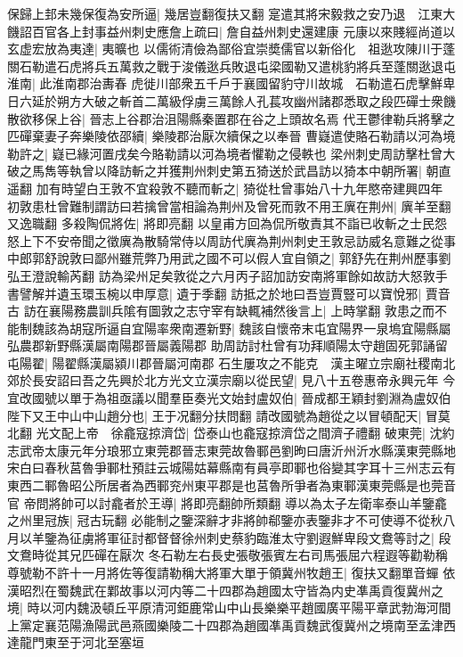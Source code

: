 保歸上邽未幾保復為安所逼|{
	幾居豈翻復扶又翻}
寔遣其將宋毅救之安乃退　江東大饑詔百官各上封事益州刺史應詹上疏曰|{
	詹自益州刺史還建康}
元康以來賤經尚道以玄虚宏放為夷達|{
	夷曠也}
以儒術清儉為鄙俗宜崇奬儒官以新俗化　祖逖攻陳川于蓬關石勒遣石虎將兵五萬救之戰于浚儀逖兵敗退屯梁國勒又遣桃豹將兵至蓬關逖退屯淮南|{
	此淮南郡治夀春}
虎徙川部衆五千戶于襄國留豹守川故城　石勒遣石虎擊鮮卑日六延於朔方大破之斬首二萬級俘虜三萬餘人孔萇攻幽州諸郡悉取之段匹磾士衆饑散欲移保上谷|{
	晉志上谷郡治沮陽縣秦置郡在谷之上頭故名焉}
代王鬱律勒兵將擊之匹磾棄妻子奔樂陵依邵續|{
	樂陵郡治厭次續保之以奉晉}
曹嶷遣使賂石勒請以河為境勒許之|{
	嶷已緣河置戌矣今賂勒請以河為境者懼勒之侵軼也}
梁州刺史周訪擊杜曾大破之馬雋等執曾以降訪斬之并獲荆州刺史第五猗送於武昌訪以猗本中朝所署|{
	朝直遥翻}
加有時望白王敦不宜殺敦不聽而斬之|{
	猗從杜曾事始八十九年愍帝建興四年}
初敦患杜曾難制謂訪曰若擒曾當相論為荆州及曾死而敦不用王廙在荆州|{
	廙羊至翻又逸職翻}
多殺陶侃將佐|{
	將即亮翻}
以皇甫方回為侃所敬責其不詣已收斬之士民怨怒上下不安帝聞之徵廙為散騎常侍以周訪代廙為荆州刺史王敦忌訪威名意難之從事中郎郭舒說敦曰鄙州雖荒弊乃用武之國不可以假人宜自領之|{
	郭舒先在荆州歷事劉弘王澄說輸芮翻}
訪為梁州足矣敦從之六月丙子詔加訪安南將軍餘如故訪大怒敦手書譬解并遺玉環玉椀以申厚意|{
	遺于季翻}
訪抵之於地曰吾豈賈豎可以寶悅邪|{
	賈音古}
訪在襄陽務農訓兵隂有圖敦之志守宰有缺輒補然後言上|{
	上時掌翻}
敦患之而不能制魏該為胡寇所逼自宜陽率衆南遷新野|{
	魏該自懷帝末屯宜陽界一泉塢宜陽縣屬弘農郡新野縣漢屬南陽郡晉屬義陽郡}
助周訪討杜曾有功拜順陽太守趙固死郭誦留屯陽翟|{
	陽翟縣漢屬潁川郡晉屬河南郡}
石生屢攻之不能克　漢主曜立宗廟社稷南北郊於長安詔曰吾之先興於北方光文立漢宗廟以從民望|{
	見八十五卷惠帝永興元年}
今宜改國號以單于為祖亟議以聞羣臣奏光文始封盧奴伯|{
	晉成都王穎封劉淵為盧奴伯}
陛下又王中山中山趙分也|{
	王于况翻分扶問翻}
請改國號為趙從之以冒頓配天|{
	冒莫北翻}
光文配上帝　徐龕寇掠濟岱|{
	岱泰山也龕寇掠濟岱之間濟子禮翻}
破東莞|{
	沈約志武帝太康元年分琅邪立東莞郡晉志東莞故魯鄆邑劉昫曰唐沂州沂水縣漢東莞縣地宋白曰春秋莒魯爭鄆杜預註云城陽姑幕縣南有員亭即鄆也俗變其字耳十三州志云有東西二鄆魯昭公所居者為西鄆兖州東平郡是也莒魯所爭者為東鄆漢東莞縣是也莞音官}
帝問將帥可以討龕者於王導|{
	將即亮翻帥所類翻}
導以為太子左衛率泰山羊鑒龕之州里冠族|{
	冠古玩翻}
必能制之鑒深辭才非將帥郗鑒亦表鑒非才不可使導不從秋八月以羊鑒為征虜將軍征討都督督徐州刺史蔡豹臨淮太守劉遐鮮卑段文鴦等討之|{
	段文鴦時從其兄匹磾在厭次}
冬石勒左右長史張敬張賓左右司馬張屈六程遐等勸勒稱尊號勒不許十一月將佐等復請勒稱大將軍大單于領冀州牧趙王|{
	復扶又翻單音蟬}
依漢昭烈在蜀魏武在鄴故事以河内等二十四郡為趙國太守皆為内史凖禹貢復冀州之境|{
	時以河内魏汲頓丘平原清河鉅鹿常山中山長樂樂平趙國廣平陽平章武勃海河間上黨定襄范陽漁陽武邑燕國樂陵二十四郡為趙國凖禹貢魏武復冀州之境南至孟津西達龍門東至于河北至塞垣}
